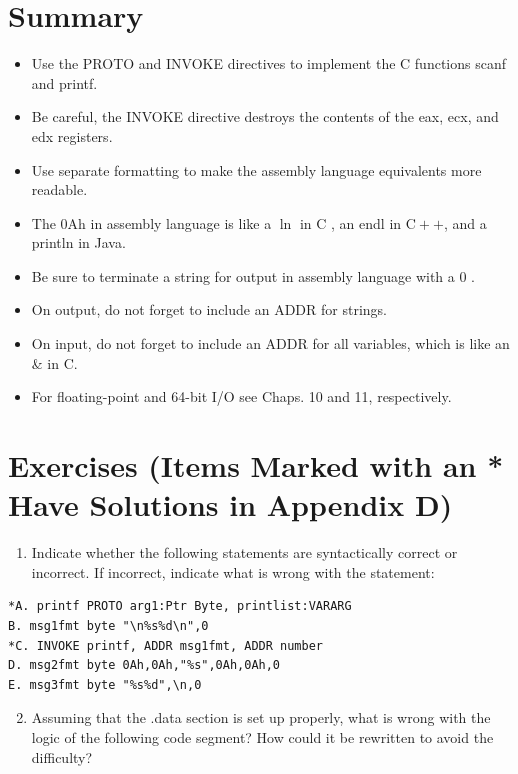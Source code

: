 \documentclass[10pt]{book}
\begin{document}
\section{Summary}
\begin{itemize}
  \item Use the PROTO and INVOKE directives to implement the C functions scanf and printf.
  \item Be careful, the INVOKE directive destroys the contents of the eax, ecx, and edx registers.
  \item Use separate formatting to make the assembly language equivalents more readable.
  \item The 0Ah in assembly language is like a $\ln$ in C , an endl in $\mathrm{C}++$, and a println in Java.
  \item Be sure to terminate a string for output in assembly language with a 0 .
  \item On output, do not forget to include an ADDR for strings.
  \item On input, do not forget to include an ADDR for all variables, which is like an \& in C.
  \item For floating-point and 64-bit I/O see Chaps. 10 and 11, respectively.
\end{itemize}

\section{Exercises (Items Marked with an * Have Solutions in Appendix D)}
\begin{enumerate}
  \item Indicate whether the following statements are syntactically correct or incorrect. If incorrect, indicate what is wrong with the statement:
\end{enumerate}

\begin{verbatim}
*A. printf PROTO arg1:Ptr Byte, printlist:VARARG
B. msg1fmt byte "\n%s%d\n",0
*C. INVOKE printf, ADDR msg1fmt, ADDR number
D. msg2fmt byte 0Ah,0Ah,"%s",0Ah,0Ah,0
E. msg3fmt byte "%s%d",\n,0
\end{verbatim}

\begin{enumerate}
  \setcounter{enumi}{1}
  \item Assuming that the .data section is set up properly, what is wrong with the logic of the following code segment? How could it be rewritten to avoid the difficulty?
\end{enumerate}
\end{document}

